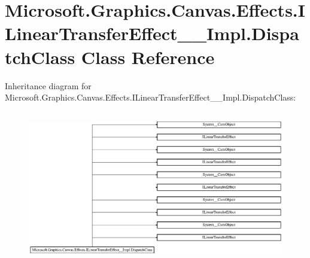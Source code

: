 \hypertarget{class_microsoft_1_1_graphics_1_1_canvas_1_1_effects_1_1_i_linear_transfer_effect_____impl_1_1_dispatch_class}{}\section{Microsoft.\+Graphics.\+Canvas.\+Effects.\+I\+Linear\+Transfer\+Effect\+\_\+\+\_\+\+Impl.\+Dispatch\+Class Class Reference}
\label{class_microsoft_1_1_graphics_1_1_canvas_1_1_effects_1_1_i_linear_transfer_effect_____impl_1_1_dispatch_class}
Inheritance diagram for Microsoft.\+Graphics.\+Canvas.\+Effects.\+I\+Linear\+Transfer\+Effect\+\_\+\+\_\+\+Impl.\+Dispatch\+Class\+:\begin{figure}[H]
\begin{center}
\leavevmode
\includegraphics[height=6.666667cm]{class_microsoft_1_1_graphics_1_1_canvas_1_1_effects_1_1_i_linear_transfer_effect_____impl_1_1_dispatch_class}
\end{center}
\end{figure}
